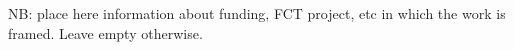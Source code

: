 NB: place here information about funding, FCT project, etc in which the work is framed. Leave empty otherwise.
